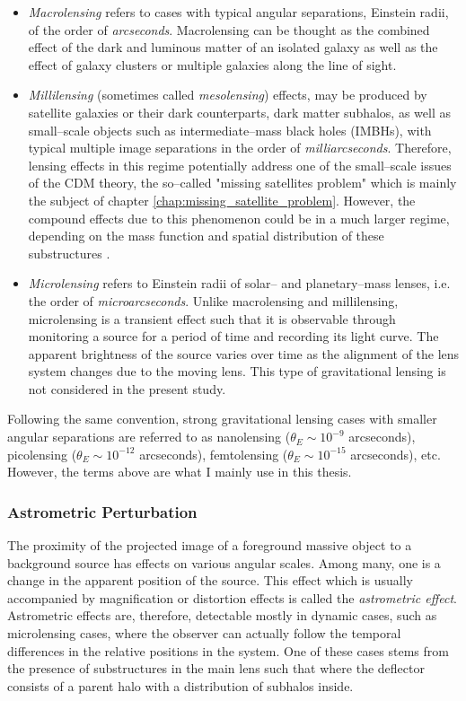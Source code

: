 \documentclass[paper=a4, fontsize=11pt]{scrartcl} %
\numberwithin{equation}{section} %
\numberwithin{figure}{section} %
\numberwithin{table}{section} %
\begin{document}
\begin{itemize} 
\item \emph{Macrolensing} refers to cases with typical angular separations, Einstein radii, of the order of \emph{arcseconds}. Macrolensing can be thought as the combined effect of the dark and luminous matter of an isolated galaxy as well as the effect of galaxy clusters or multiple galaxies along the line of sight. 
\item \emph{Millilensing} (sometimes called \emph{mesolensing}) effects, may be produced by satellite galaxies or their dark counterparts, dark matter subhalos, as well as small--scale objects such as intermediate--mass black holes (IMBHs), with typical multiple image separations in the order of \emph{milliarcseconds}. Therefore, lensing effects in this regime potentially address one of the small--scale issues of the CDM theory, the so--called "missing satellites problem" which is mainly the subject of chapter \ref{chap:missing_satellite_problem}. However, the compound effects due to this phenomenon could be in a much larger regime, depending on the mass function and spatial distribution of these substructures \citet{Treu10}.
\item \emph{Microlensing} refers to Einstein radii of solar-- and planetary--mass lenses, i.e. the order of \emph{microarcseconds}. Unlike macrolensing and millilensing, microlensing is a transient effect such that it is observable through monitoring a source for a period of time and recording its light curve. The apparent brightness of the source varies over time as the alignment of the lens system changes due to the moving lens. This type of gravitational lensing is not considered in the present study.
\end{itemize}

Following the same convention, strong gravitational lensing cases with smaller angular separations are referred to as nanolensing ($\theta_E \sim 10^{-9}$ arcseconds), picolensing ($\theta_E \sim 10^{-12}$ arcseconds), femtolensing ($\theta_E \sim 10^{-15}$ arcseconds), etc. However, the terms above are what I mainly use in this thesis.

 \subsubsection{Astrometric Perturbation}
 The proximity of the projected image of a foreground massive object to a background source has effects on various angular scales. Among many, one is a change in the apparent position of the source. This effect which is usually accompanied by magnification or distortion effects is called the \emph{astrometric effect}. Astrometric effects are, therefore, detectable mostly in dynamic cases, such as microlensing cases, where the observer can actually follow the temporal differences in the relative positions in the system. One of these cases stems from the presence of substructures in the main lens such that where the deflector consists of a parent halo with a distribution of subhalos inside. 
 
\end{document}
